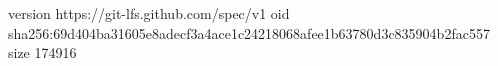 version https://git-lfs.github.com/spec/v1
oid sha256:69d404ba31605e8adecf3a4ace1c24218068afee1b63780d3c835904b2fac557
size 174916
